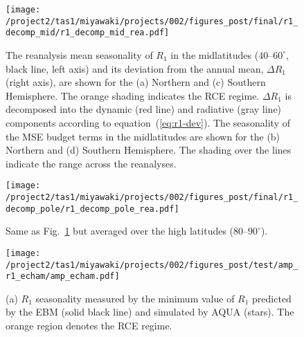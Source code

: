 \documentclass{ametsocV5}
\begin{document}
\begin{figure}[t]
  \noindent\texttt{[image: /project2/tas1/miyawaki/projects/002/figures\_post/final/r1\_decomp\_mid/r1\_decomp\_mid\_rea.pdf]}\\
  \caption{The reanalysis mean seasonality of $R_{1}$ in the midlatitudes ($40$--$60^{\circ}$, black line, left axis) and its deviation from the annual mean, $\Delta R_1$ (right axis), are shown for the (a) Northern and (c) Southern Hemisphere. The orange shading indicates the RCE regime. $\Delta R_1$ is decomposed into the dynamic (red line) and radiative (gray line) components according to equation~(\ref{eq:r1-dev}). The seasonality of the MSE budget terms in the midlatitudes are shown for the (b) Northern and (d) Southern Hemisphere. The shading over the lines indicate the range across the reanalyses.}
  \label{fig:rea-r1-decomp-mid}
\end{figure}

\begin{figure}[t]
  \noindent\texttt{[image: /project2/tas1/miyawaki/projects/002/figures\_post/final/r1\_decomp\_pole/r1\_decomp\_pole\_rea.pdf]}\\
  \caption{Same as Fig.~\ref{fig:rea-r1-decomp-mid} but averaged over the high latitudes ($80$--$90^{\circ}$).}
  \label{fig:rea-r1-decomp-pole}
\end{figure}

\begin{figure}
  \noindent\texttt{[image: /project2/tas1/miyawaki/projects/002/figures\_post/test/amp\_r1\_echam/amp\_echam.pdf]}\\
  \caption{(a) $R_1$ seasonality measured by the minimum value of $R_1$ predicted by the EBM (solid black line) and simulated by AQUA (stars). The orange region denotes the RCE regime.}
  \label{fig:amp-r1-echam}
\end{figure}
\end{document}
